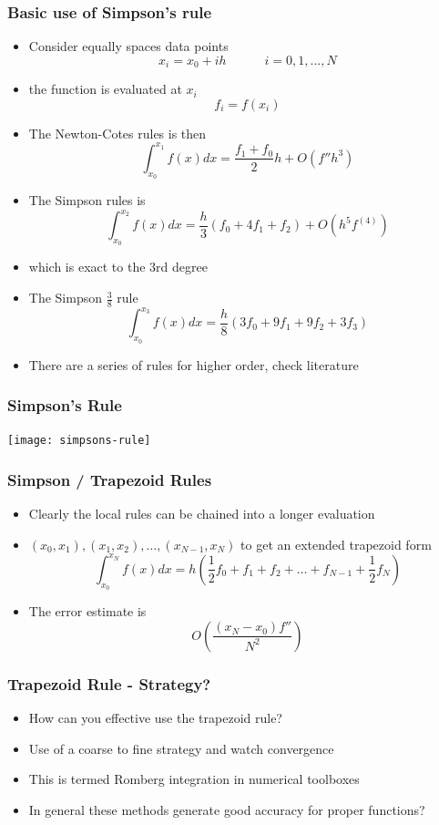 \documentclass[10pt]{beamer}
\begin{document}
\begin{frame}
  \frametitle{Basic use of Simpson's rule}
  \begin{itemize}
  \item Consider equally spaces data points
    \[
      x_i = x_0 + i h \mbox{ ~~~~~~~~} i = 0, 1, ..., N
    \]
    
  \item the function is evaluated at $x_i$
    \[
      f_i = f(x_i)
    \]
  \item The Newton-Cotes rules is then
    \[
      \int_{x_0}^{x_1} f(x) dx = \frac{f_1+f_0}{2} h + O(f'' h^3)
    \]
  \item The Simpson rules is
    \[
      \int_{x_0}^{x_2} f(x) dx = \frac{h}{3} (f_0 + 4 f_1 + f_2) + O(h^5 f^{(4)})
    \]
  \item which is exact to the 3rd degree
  \item The Simpson $\frac{3}{8}$ rule
    \[
      \int_{x_0}^{x_3} f(x) dx = \frac{h}{8} (3 f_0 + 9 f_1 + 9 f_2 + 3 f_3)
    \]
  \item There are a series of rules for higher order, check literature
  \end{itemize}
\end{frame}


\begin{frame}
  \frametitle{Simpson's Rule}
  \centerline{\texttt{[image: simpsons-rule]}}
\end{frame}

\begin{frame}
  \frametitle{Simpson / Trapezoid Rules}
  \begin{itemize}
  \item Clearly the local rules can be chained into a longer evaluation
  \item $(x_0, x_1), (x_1, x_2), \ldots, (x_{N-1},x_N)$ to get an extended
    trapezoid form
    \[
      \int_{x_0}^{x_N} f(x) dx = h(\frac{1}{2} f_0 + f_1 + f_2 + \ldots + f_{N-1} + \frac{1}{2} f_N )
    \]
  \item The error estimate is
    \[
      O\left( \frac{(x_N - x_0) f''}{N^2} \right)
    \]
  \end{itemize}
\end{frame}

\begin{frame}
  \frametitle{Trapezoid Rule - Strategy?}
  \begin{itemize}
  \item How can you effective use the trapezoid rule?
    \pause
  \item Use of a coarse to fine strategy and watch convergence
  \item This is termed Romberg integration in numerical toolboxes
  \item In general these methods generate good accuracy for proper functions? 
  \end{itemize}
\end{frame}
\end{document}
